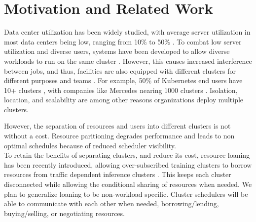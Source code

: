 \section{Motivation and Related Work}
Data center utilization has been widely studied, with average server utilization in most data centers being low, 
ranging from 10\% to 50\%
\cite{lo_heracles_2015}. 
To combat low server utilization and diverse users, systems have been developed to allow diverse workloads to run 
on the same cluster \cite{bhattacharya_hierarchical_2013, hindman_mesos_nodate}. 
However, this causes increased interference between jobs, and thus, 
facilities are also equipped with different clusters for different purposes and teams \cite{patel_what_2022, li_lyra_2023}. 
For example, 50\% of Kubernetes \cite{verma_large-scale_2015}
end users have 10+ clusters \cite{noauthor_cncf_2023} 
, with companies like Mercedes nearing 1000 clusters \cite{noauthor_mercedes-benz_2023}.
Isolation, location, and scalability are among other reasons organizations deploy multiple clusters.

However, the separation of resources and users into different clusters is not without a cost. 
Resource paritioning degrades performance %
and leads to non optimal schedules because of reduced scheduler visibility.\\ %

To retain the benefits of separating clusters, and reduce its cost, resource loaning has been recently 
introduced, allowing over-subscribed training clusters to 
borrow resources from traffic dependent inference clusters \cite{li_lyra_2023}. This keeps each cluster disconnected 
while allowing the conditional sharing of resources when needed.
We plan to generalize loaning to be non-workload specific. Cluster schedulers will be able to communicate 
with each other when needed, borrowing/lending, buying/selling, or negotiating resources. %
